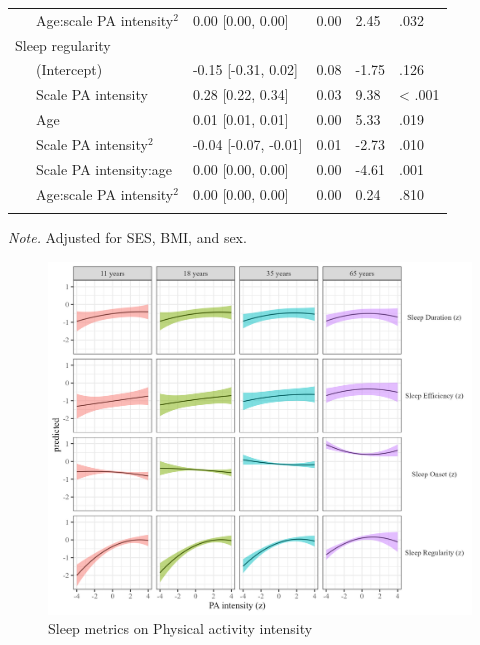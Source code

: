 \documentclass[
  man]{apa6}
\begin{document}
\begin{table}[tbp]
\begin{center}
\begin{threeparttable}
\begin{tabular}{lllll}
\ \ \ Age:scale PA intensity$^2$ & 0.00 [0.00, 0.00] & 0.00 & 2.45 & .032\\
Sleep regularity &  &  &  & \\
\ \ \ (Intercept) & -0.15 [-0.31, 0.02] & 0.08 & -1.75 & .126\\
\ \ \ Scale PA intensity & 0.28 [0.22, 0.34] & 0.03 & 9.38 & < .001\\
\ \ \ Age & 0.01 [0.01, 0.01] & 0.00 & 5.33 & .019\\
\ \ \ Scale PA intensity$^2$ & -0.04 [-0.07, -0.01] & 0.01 & -2.73 & .010\\
\ \ \ Scale PA intensity:age & 0.00 [0.00, 0.00] & 0.00 & -4.61 & .001\\
\ \ \ Age:scale PA intensity$^2$ & 0.00 [0.00, 0.00] & 0.00 & 0.24 & .810\\
\bottomrule
\addlinespace
\end{tabular}

\begin{tablenotes}[para]
\normalsize{\textit{Note.} Adjusted for SES, BMI, and sex. }
\end{tablenotes}

\end{threeparttable}
\end{center}

\end{table}

\begin{figure}
\includegraphics[width=1.1\linewidth]{../Figures/sleep on pa_intensity} \caption{Sleep metrics on Physical activity intensity}\label{fig:sleep-by-intensity-fig}
\end{figure}
\end{document}
